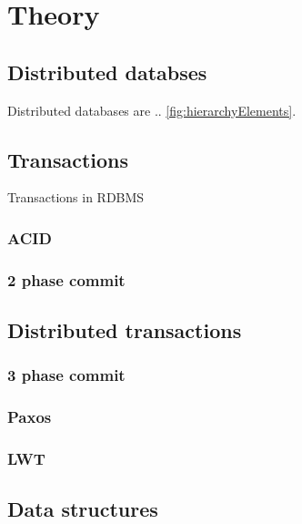 \chapter{Theory}\label{chapter:theory}

\section{Distributed databses}\label{sec:theory:distDbs}
Distributed databases are .. \ref{fig:hierarchyElements}. \cite{CassandraDataStaxDocs} \cite{chandra2007PaxosMadeLive} \cite{lamport1982byzantine}

\section{Transactions}\label{sec:theory:transactions}
Transactions in RDBMS

\subsection{ACID}

\subsection{2 phase commit}

\section{Distributed transactions}

\subsection{3 phase commit}

\subsection{Paxos}

\subsection{LWT}


\section{Data structures}\label{sec:basics:dataStructures}

